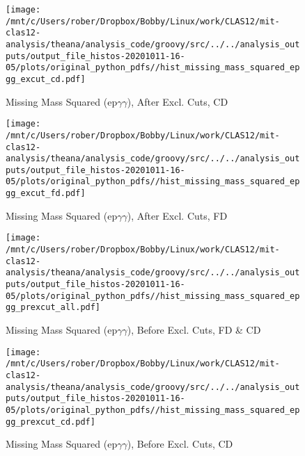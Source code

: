 \documentclass{article}
\begin{document}
\begin{landscape}
    \begin{figure}[h]
        \centering

        \texttt{[image: /mnt/c/Users/rober/Dropbox/Bobby/Linux/work/CLAS12/mit-clas12-analysis/theana/analysis\_code/groovy/src/../../analysis\_outputs/output\_file\_histos-20201011-16-05/plots/original\_python\_pdfs//hist\_missing\_mass\_squared\_epgg\_excut\_cd.pdf]}
        \captionsetup{textformat=empty,labelformat=blank}
        \caption{Missing Mass Squared (ep$\gamma$$\gamma$), After Excl. Cuts, CD}
    \end{figure}
    \clearpage
    
    \begin{figure}[h]
        \centering

        \texttt{[image: /mnt/c/Users/rober/Dropbox/Bobby/Linux/work/CLAS12/mit-clas12-analysis/theana/analysis\_code/groovy/src/../../analysis\_outputs/output\_file\_histos-20201011-16-05/plots/original\_python\_pdfs//hist\_missing\_mass\_squared\_epgg\_excut\_fd.pdf]}
        \captionsetup{textformat=empty,labelformat=blank}
        \caption{Missing Mass Squared (ep$\gamma$$\gamma$), After Excl. Cuts, FD}
    \end{figure}
    \clearpage
    
    \begin{figure}[h]
        \centering

        \texttt{[image: /mnt/c/Users/rober/Dropbox/Bobby/Linux/work/CLAS12/mit-clas12-analysis/theana/analysis\_code/groovy/src/../../analysis\_outputs/output\_file\_histos-20201011-16-05/plots/original\_python\_pdfs//hist\_missing\_mass\_squared\_epgg\_prexcut\_all.pdf]}
        \captionsetup{textformat=empty,labelformat=blank}
        \caption{Missing Mass Squared (ep$\gamma$$\gamma$), Before Excl. Cuts, FD \& CD}
    \end{figure}
    \clearpage
    
    \begin{figure}[h]
        \centering

        \texttt{[image: /mnt/c/Users/rober/Dropbox/Bobby/Linux/work/CLAS12/mit-clas12-analysis/theana/analysis\_code/groovy/src/../../analysis\_outputs/output\_file\_histos-20201011-16-05/plots/original\_python\_pdfs//hist\_missing\_mass\_squared\_epgg\_prexcut\_cd.pdf]}
        \captionsetup{textformat=empty,labelformat=blank}
        \caption{Missing Mass Squared (ep$\gamma$$\gamma$), Before Excl. Cuts, CD}
    \end{figure}
    \clearpage
    

\end{landscape}
\end{document}
